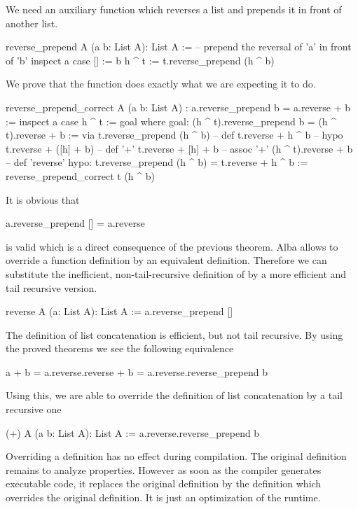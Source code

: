We need an auxiliary function which reverses a list and prepends it in front
of another list.

\begin{alba}
  reverse_prepend A (a b: List A): List A :=
      -- prepend the reversal of 'a' in front of 'b'
    inspect
      a
    case
      [] :=
        b
      h ^ t :=
        t.reverse_prepend (h ^ b)
\end{alba}


We prove that the function does exactly what we are expecting it to do.

\begin{alba}
  reverse_prepend_correct
    A (a b: List A)
    : a.reverse_prepend b = a.reverse + b :=
      inspect a case
        h ^ t :=
          goal where
            goal: (h ^ t).reverse_prepend  b = (h ^ t).reverse + b :=
              via
                t.reverse_prepend (h ^ b)            -- def
                t.reverse + h ^ b                    -- hypo
                t.reverse + ([h] + b)                -- def '+'
                t.reverse + [h] + b                  -- assoc '+'
                (h ^ t).reverse + b                  -- def 'reverse'
             hypo: t.reverse_prepend (h ^ b) = t.reverse + h ^ b :=
               reverse_prepend_correct t (h ^ b)
\end{alba}


It is obvious that
%
\begin{alba}
  a.reverse_prepend [] = a.reverse
\end{alba}
%
is valid which is a direct consequence of the previous theorem. Alba allows to
override a function definition by an equivalent definition. Therefore we can
substitute the inefficient, non-tail-recursive definition of  by
a more efficient and tail recursive version.

\begin{alba}
  reverse A (a: List A): List A :=
    a.reverse_prepend []
\end{alba}

The definition of list concatenation is efficient, but not tail recursive. By
using the proved theorems we see the following equivalence
%
\begin{alba}
  a + b   =  a.reverse.reverse + b
          =  a.reverse.reverse_prepend b
\end{alba}

Using this, we are able to override the definition of list concatenation by a
tail recursive one

\begin{alba}
  (+) A (a b: List A): List A :=
    a.reverse.reverse_prepend b
\end{alba}

Overriding a definition has no effect during compilation. The original
definition remains to analyze properties. However as soon as the compiler
generates executable code, it replaces the original definition by the
definition which overrides the original definition. It is just an optimization
of the runtime.






